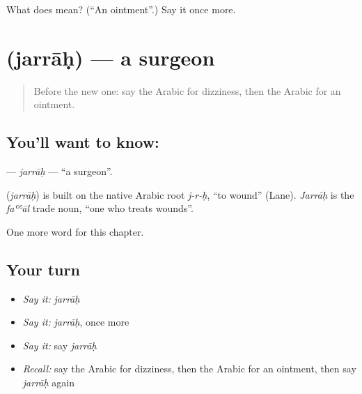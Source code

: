 \begin{tcolorbox}[breakable,colback=teal!4,colframe=teal!35!black,title={Before you move on}]
What does  mean? (\textquotedblleft{}An ointment\textquotedblright{}.) Say it once more.
\end{tcolorbox}
\section[\texorpdfstring{\ar{جراح} (jarrāḥ)}{جراح (jarrāḥ)}]{ (jarrāḥ) — a surgeon}

\label{lesson:AR-C232-jarrah}



\begin{quote}
Before the new one: say the Arabic for dizziness, then the Arabic for an ointment.
\end{quote}

\subsection*{You'll want to know: }
\textbf{} — \emph{jarrāḥ} — \textquotedblleft{}a surgeon\textquotedblright{}.

\begin{cousinweb}
\textbf{} (\emph{jarrāḥ}) is built on the native Arabic root \emph{j-r-ḥ}, \textquotedblleft{}to wound\textquotedblright{} (Lane). \emph{Jarrāḥ} is the \emph{faʿʿāl} trade noun, \textquotedblleft{}one who treats wounds\textquotedblright{}.
\end{cousinweb}

\begin{grammarlens}[title={What you've built}]
One more word for this chapter.
\end{grammarlens}

\subsection*{Your turn}
\begin{itemize}
\raggedright
  \item \emph{Say it:} \emph{jarrāḥ}
  \item \emph{Say it:} \emph{jarrāḥ}, once more
  \item \emph{Say it:} say \emph{jarrāḥ}
  \item \emph{Recall:} say the Arabic for dizziness, then the Arabic for an ointment, then say \emph{jarrāḥ} again
\end{itemize}


